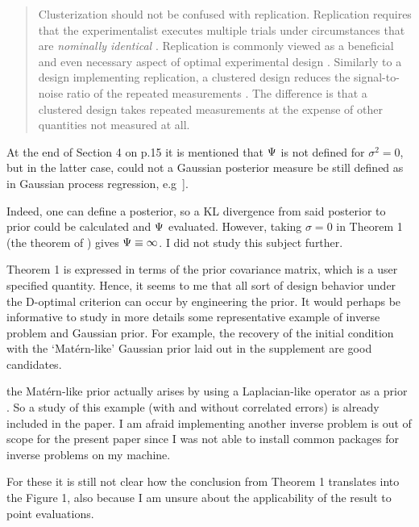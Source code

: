 \begin{quote} %
Clusterization should not be confused with replication. Replication
requires that the experimentalist executes multiple trials under
circumstances that are \emph{nominally identical} \cite[Section
  1.2.4]{morris2011}. Replication is commonly viewed as a beneficial
and even necessary aspect of optimal experimental design
\cite{fisher1949design, morris2011, schafer2001replication}. Similarly
to a design implementing replication, a clustered design reduces the
signal-to-noise ratio of the repeated measurements
\cite{telford2007brief}. The difference is that a clustered design
takes repeated measurements at the expense of other quantities not
measured at all.
\end{quote}
  
  
\RC At the end of Section 4 on p.15 it is mentioned that $\Psi$ is not
defined for $\sigma^2= 0$, but in the latter case, could not a
Gaussian posterior measure be still defined as in Gaussian process
regression, e.g~\cite{rasmussen2006}].

\AR Indeed, one can define a posterior, so a KL divergence from said
posterior to prior could be calculated and $\Psi$ evaluated. However,
taking $\sigma = 0$ in Theorem 1 (the theorem of
\cite{AlexanderianGloorGhattas14}) gives $\Psi \equiv \infty$. I did
not study this subject further.

  
\RC Theorem 1 is expressed in terms of the prior covariance matrix,
which is a user specified quantity. Hence, it seems to me that all
sort of design behavior under the D-optimal criterion can occur by
engineering the prior. It would perhaps be informative to study in
more details some representative example of inverse problem and
Gaussian prior. For example, the recovery of the initial condition
with the ‘Mat\'ern-like’ Gaussian prior laid out in the supplement are
good candidates.

\AR the Mat\'ern-like prior actually arises by using a Laplacian-like
operator as a prior \cite{rue2011}. So a study of this example (with
and without correlated errors) is already included in the paper. I am
afraid implementing another inverse problem is out of scope for the
present paper since I was not able to install common packages for
inverse problems \cite{attia2023pyoed, VillaPetraGhattas16} on my
machine.
  
\RC For these it is still not clear how the conclusion from Theorem 1
translates into the Figure 1, also because I am unsure about the
applicability of the result to point evaluations.

